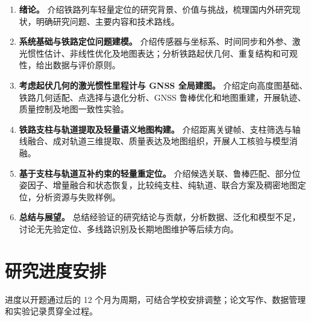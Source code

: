 \documentclass[UTF8,a4paper,12pt,fontset=fandol]{ctexart}
\begin{document}
\begin{enumerate}[label=第\arabic*章：,leftmargin=5em]
 \item \textbf{绪论。}
 介绍铁路列车轻量定位的研究背景、价值与挑战，梳理国内外研究现状，明确研究问题、主要内容和技术路线。
 \item \textbf{系统基础与铁路定位问题建模。}
 介绍传感器与坐标系、时间同步和外参、激光惯性估计、非线性优化及地图表达；分析铁路起伏几何、重复结构和可观性，给出数据与评价原则。
 \item \textbf{考虑起伏几何的激光惯性里程计与 GNSS 全局建图。}
 介绍定向高度图基础、铁路几何适配、点选择与退化分析、GNSS 鲁棒优化和地图重建，开展轨迹、质量控制及地图一致性实验。
 \item \textbf{铁路支柱与轨道提取及轻量语义地图构建。}
 介绍距离关键帧、支柱筛选与轴线融合、成对轨道三维提取、质量表达及地图组织，开展人工核验与模型消融。
 \item \textbf{基于支柱与轨道互补约束的轻量重定位。}
 介绍候选关联、鲁棒匹配、部分位姿因子、增量融合和状态恢复，比较纯支柱、纯轨道、联合方案及稠密地图定位，分析资源与失败样例。
 \item \textbf{总结与展望。}
 总结经验证的研究结论与贡献，分析数据、泛化和模型不足，讨论无先验定位、多线路识别及长期地图维护等后续方向。
\end{enumerate}

\section{研究进度安排}

进度以开题通过后的 12 个月为周期，可结合学校安排调整；论文写作、数据管理和实验记录贯穿全过程。
\end{document}
